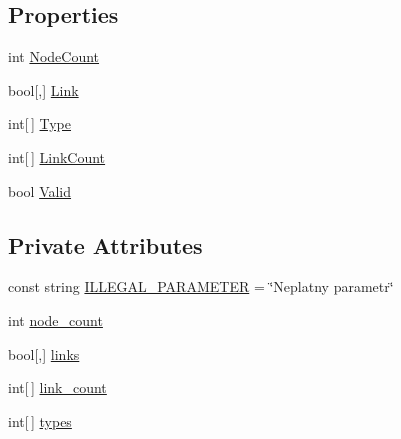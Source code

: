 \subsection*{Properties}
\begin{DoxyCompactItemize}
\item 
int \hyperlink{classNetTrafficSimulator_1_1NetworkModel_ae999583acaea839a7611f610bed2fed6}{Node\-Count}
\item 
bool\mbox{[},\mbox{]} \hyperlink{classNetTrafficSimulator_1_1NetworkModel_aa1466fa74cbddeefb31b5d7369db983e}{Link}
\item 
int\mbox{[}$\,$\mbox{]} \hyperlink{classNetTrafficSimulator_1_1NetworkModel_a92df1a7e9c05637930eae22d788f7c18}{Type}
\item 
int\mbox{[}$\,$\mbox{]} \hyperlink{classNetTrafficSimulator_1_1NetworkModel_ad5eb61d192908f46907fd7f91f796691}{Link\-Count}
\item 
bool \hyperlink{classNetTrafficSimulator_1_1NetworkModel_a58af85d9a9121926149ef5e2ce332e76}{Valid}
\end{DoxyCompactItemize}
\subsection*{Private Attributes}
\begin{DoxyCompactItemize}
\item 
const string \hyperlink{classNetTrafficSimulator_1_1NetworkModel_a9ff3800009133089edb0744d2771b0b9}{I\-L\-L\-E\-G\-A\-L\-\_\-\-P\-A\-R\-A\-M\-E\-T\-E\-R} = \char`\"{}Neplatny parametr\char`\"{}
\item 
int \hyperlink{classNetTrafficSimulator_1_1NetworkModel_a85f9941bb3af088bd078b273f0cb4e52}{node\-\_\-count}
\item 
bool\mbox{[},\mbox{]} \hyperlink{classNetTrafficSimulator_1_1NetworkModel_a01410c5733a30fb4e37208c8b94fdf8d}{links}
\item 
int\mbox{[}$\,$\mbox{]} \hyperlink{classNetTrafficSimulator_1_1NetworkModel_a1437bfc2aad1a396054b03452e60c0dd}{link\-\_\-count}
\item 
int\mbox{[}$\,$\mbox{]} \hyperlink{classNetTrafficSimulator_1_1NetworkModel_aa8f0b62fb9e9029f0068135b56a46a9c}{types}
\end{DoxyCompactItemize}


